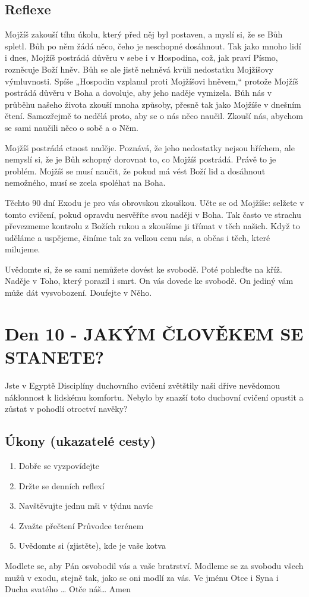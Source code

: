 \documentclass[11pt]{article}
\newcommand{\zacatekDruhyTyden}{
  Jste v Egyptě \newline
  Disciplíny duchovního cvičení zvětštily naši dříve nevědomou náklonnost k lidskému komfortu.
  Nebylo by snazší toto duchovní cvičení opustit a zůstat v pohodlí otroctví navěky?

  \subsection*{Úkony (ukazatelé cesty)}
\begin{enumerate}
  \item Dobře se vyzpovídejte
  \item Držte se denních reflexí
  \item Navštěvujte jednu mši v týdnu navíc
  \item Zvažte přečtení Průvodce terénem
  \item Uvědomte si (zjistěte), kde je vaše kotva
\end{enumerate}
Modlete se, aby Pán osvobodil vás a vaše bratrství. \newline
Modleme se za svobodu všech mužů v exodu, stejně tak, jako se oni modlí za vás.\newline
Ve jménu Otce i Syna i Ducha svatého …  Otče náš… Amen
}
\begin{document}
\subsection*{Reflexe}
Mojžíš zakouší tíhu úkolu, který před něj byl postaven, a myslí si, že se Bůh spletl. Bůh po něm žádá něco,
čeho je neschopné dosáhnout. Tak jako mnoho lidí i dnes, Mojžíš postrádá důvěru v sebe i v Hospodina,
což, jak praví Písmo, rozněcuje Boží hněv. Bůh se ale jistě nehněvá kvůli nedostatku Mojžíšovy
výmluvnosti. Spíše „Hospodin vzplanul proti Mojžíšovi hněvem,“ protože Mojžíš postrádá důvěru v Boha
a dovoluje, aby jeho naděje vymizela. Bůh nás v průběhu našeho života zkouší mnoha způsoby, přesně tak
jako Mojžíše v dnešním čtení. Samozřejmě to nedělá proto, aby se o nás něco naučil. Zkouší nás, abychom
se sami naučili něco o sobě a o Něm.

Mojžíš postrádá ctnost naděje. Poznává, že jeho nedostatky nejsou hříchem, ale nemyslí si, že je Bůh
schopný dorovnat to, co Mojžíš postrádá. Právě to je problém. Mojžíš se musí naučit, že pokud má vést
Boží lid a dosáhnout nemožného, musí se zcela spoléhat na Boha.

Těchto 90 dní Exodu je pro vás obrovskou zkouškou. Učte se od Mojžíše: selžete v tomto cvičení, pokud
opravdu nesvěříte svou naději v Boha. Tak často ve strachu převezmeme kontrolu z Božích rukou a
zkoušíme ji třímat v těch našich. Když to uděláme a uspějeme, činíme tak za velkou cenu nás, a občas i
těch, které milujeme.

Uvědomte si, že se sami nemůžete dovést ke svobodě. Poté pohleďte na kříž. Naděje v Toho, který porazil
i smrt. On vás dovede ke svobodě. On jediný vám může dát vysvobození. Doufejte v Něho.

\newpage
\section{Den 10 - JAKÝM ČLOVĚKEM SE STANETE?}
\zacatekDruhyTyden
\end{document}
